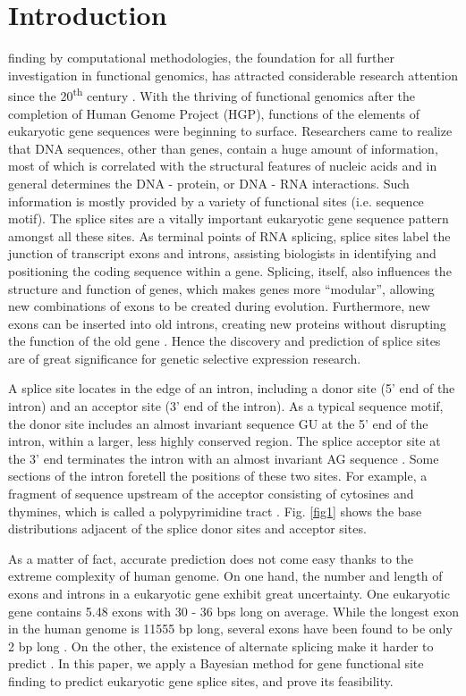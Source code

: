 \documentclass[journal,twoside]{IEEEtran}
\begin{document}
\section{Introduction}\label{1}

 finding by computational methodologies, the foundation for all further investigation in functional genomics, has attracted considerable research attention since the 20\textsuperscript{th} century \cite{burge1997prediction}. With the thriving of functional genomics after the completion of Human Genome Project (HGP), functions of the elements of eukaryotic gene sequences were beginning to surface. Researchers came to realize that DNA sequences, other than genes, contain a huge amount of information, most of which is correlated with the structural features of nucleic acids and in general determines the DNA - protein, or DNA - RNA interactions. Such information is mostly provided by a variety of functional sites (i.e. sequence motif). The splice sites are a vitally important eukaryotic gene sequence pattern amongst all these sites. As terminal points of RNA splicing, splice sites label the junction of transcript exons and introns, assisting biologists in identifying and positioning the coding sequence within a gene. Splicing, itself, also influences the structure and function of genes, which makes genes more ``modular'', allowing new combinations of exons to be created during evolution. Furthermore, new exons can be inserted into old introns, creating new proteins without disrupting the function of the old gene \cite{clancy2008rna}. Hence the discovery and prediction of splice sites are of great significance for genetic selective expression research. 

A splice site locates in the edge of an intron, including a donor site (5' end of the intron) and an acceptor site (3' end of the intron). As a typical sequence motif, the donor site includes an almost invariant sequence GU at the 5' end of the intron, within a larger, less highly conserved region. The splice acceptor site at the 3' end terminates the intron with an almost invariant AG sequence \cite{black2003mechanisms}.  Some sections of the intron foretell the positions of these two sites. For example, a fragment of sequence upstream of the acceptor consisting of cytosines and thymines, which is called a polypyrimidine tract \cite{lodish2008molecular}. Fig. \ref{fig1} shows the base distributions adjacent of the splice donor sites and acceptor sites. 

As a matter of fact, accurate prediction does not come easy thanks to the extreme complexity of human genome. On one hand, the number and length of exons and introns in a eukaryotic gene exhibit great uncertainty. One eukaryotic gene contains 5.48 exons with 30 - 36 bps long on average. While the longest exon in the human genome is 11555 bp long, several exons have been found to be only 2 bp long \cite{sakharkar2004distributions}. On the other, the existence of alternate splicing make it harder to predict \cite{black2003mechanisms}. In this paper, we apply a Bayesian method for gene functional site finding to predict eukaryotic gene splice sites, and prove its feasibility. 
\end{document}
